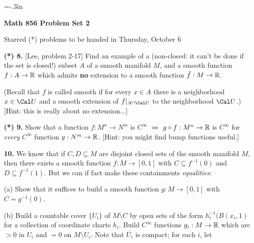 
\nopagenumbers

\vsize=10in
\voffset=-.3in


\loadmsbm

\def\ctln{\centerline}
\def\ssk{\smallskip}
\def\msk{\medskip}
\def\bsk{\bigskip}
\def\nidt{\noindent}
\def\del{\partial}
\def\bbr{{\Bbb R}}
\def\cla{{\Cal A}}
\def\clb{{\Cal B}}
\def\clc{{\Cal C}}
\def\ra{\rightarrow}
\def\lra{$\Leftrightarrow$}

\ctln{\bf Math 856 Problem Set 2}

\ssk

\ctln{Starred (*) problems to be handed in Thursday, October 6}

\bsk

\item{\bf (*) 8.} [Lee, problem 2-17] Find an example of a (non-closed: it can't be done if the set is
closed!) subset $A$ of a smooth manifold $M$, and a smooth function $f:A\rightarrow \bbr$ which admits
{\bf no} extension to a smooth function $\tilde{f}:M\rightarrow \bbr$. 

\ssk

\item{} (Recall that $f$ is called smooth if for every $x\in A$ there is a neighborhood $x\in{\Cal U}$ and a smooth
extension of $f|_{A\cap {\Cal U}}$ to the neighborhood ${\Cal U}$.) [Hint: this is really about no
 extension...]

\msk

\item{\bf (*) 9.} Show that a function $f:M^n\rightarrow N^m$ is $C^\infty$ $\Leftrightarrow$ 
$g\circ f:M^n\rightarrow {\Bbb R}$ is $C^\infty$ for {\it every} $C^\infty$ function
$g:N^m\rightarrow {\Bbb R}$. [Hint: you might find bump functions useful.]

\msk

\item{\bf 10.} We know that if $C,D\subseteq M$ are disjoint closed sets of the smooth manifold $M$,
then there exists a smooth function $f:M\ra [0,1]$ with $C\subseteq f^{-1}(0)$ and $D\subseteq f^{-1}(1)$.
But we can if fact make these containments {\it equalities}:

\ssk

\item{(a)} Show that it suffices to build a smooth function $g:M\ra [0,1]$ with $C=g^{-1}(0)$.

\ssk

\item{(b)} Build a countable cover $\{U_i\}$ of $M\setminus C$ by open sets of the form $h_i^{-1}(B(x_i,1)$ for
a collection of coordinate charts $h_i$. Build $C^\infty$ functions $g_i:M\ra \bbr$ which are $>0$
in $U_i$ and $=0$ on $M\setminus U_i$. Note that $\overline{U_i}$ is compact; for each $i$, let

